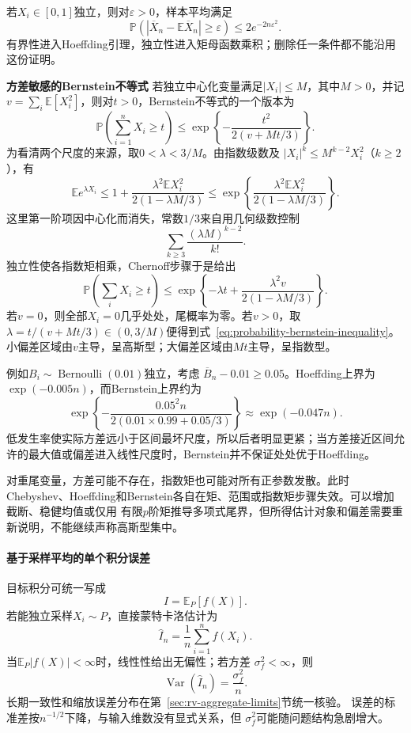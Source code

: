 若\(X_i\in[0,1]\)独立，则对\(\varepsilon>0\)，样本平均满足
\[ \mathbb{P}(|\overline{X}_n-\mathbb{E}\overline{X}_n|
  \geq\varepsilon)\leq 2e^{-2n\varepsilon^2}. \]
有界性进入Hoeffding引理，独立性进入矩母函数乘积；删除任一条件都不能沿用这份证明。

\par\medskip\noindent\textbf{方差敏感的Bernstein不等式}\quad
若独立中心化变量满足\(|X_i|\leq M\)，其中\(M>0\)，并记\(v=\sum_i\mathbb{E}[X_i^2]\)，则对\(t>0\)，Bernstein不等式的一个版本为
\begin{equation}
  \mathbb{P}\left(\sum_{i=1}^{n}X_i\geq t\right)
  \leq
  \exp\left\{
    -\frac{t^2}{2(v+Mt/3)}
  \right\}.
  \label{eq:probability-bernstein-inequality}
\end{equation}
为看清两个尺度的来源，取\(0<\lambda<3/M\)。由指数级数及
\(|X_i|^k\leq M^{k-2}X_i^2\)（\(k\geq2\)），有
\[
  \mathbb{E}e^{\lambda X_i}
  \leq
  1+\frac{\lambda^2\mathbb{E}X_i^2}
           {2(1-\lambda M/3)}
  \leq
  \exp\left\{
    \frac{\lambda^2\mathbb{E}X_i^2}
         {2(1-\lambda M/3)}
  \right\}.
\]
这里第一阶项因中心化而消失，常数\(1/3\)来自用几何级数控制
\[
  \sum_{k\geq3}\frac{(\lambda M)^{k-2}}{k!}.
\]
独立性使各指数矩相乘，Chernoff步骤于是给出
\[
  \mathbb{P}\left(\sum_iX_i\geq t\right)
  \leq
  \exp\left\{
    -\lambda t+\frac{\lambda^2v}
      {2(1-\lambda M/3)}
  \right\}.
\]
若\(v=0\)，则全部\(X_i=0\)几乎处处，尾概率为零。若\(v>0\)，取\(\lambda=t/(v+Mt/3)\in(0,3/M)\)便得到式~\eqref{eq:probability-bernstein-inequality}。小偏差区域由\(v\)主导，呈高斯型；大偏差区域由\(Mt\)主导，呈指数型。

例如\(B_i\sim\operatorname{Bernoulli}(0.01)\)独立，考虑
\(\overline{B}_n-0.01\geq0.05\)。Hoeffding上界为
\(\exp(-0.005n)\)，而Bernstein上界约为
\[
  \exp\left\{
    -\frac{0.05^2n}
      {2(0.01\times0.99+0.05/3)}
  \right\}
  \approx \exp(-0.047n).
\]
低发生率使实际方差远小于区间最坏尺度，所以后者明显更紧；当方差接近区间允许的最大值或偏差进入线性尺度时，Bernstein并不保证处处优于Hoeffding。

对重尾变量，方差可能不存在，指数矩也可能对所有正参数发散。此时Chebyshev、Hoeffding和Bernstein各自在矩、范围或指数矩步骤失效。可以增加截断、稳健均值或仅用
有限\(p\)阶矩推导多项式尾界，但所得估计对象和偏差需要重新说明，不能继续声称高斯型集中。

\paragraph{基于采样平均的单个积分误差}
\label{sec:probability-monte-carlo-variance-reduction}
目标积分可统一写成
\[ I=\mathbb{E}_P[f(X)]. \]
若能独立采样\(X_i\sim P\)，直接蒙特卡洛估计为
\[ \widehat{I}_n
  =\frac{1}{n}\sum_{i=1}^{n}f(X_i). \]
当\(\mathbb E_P|f(X)|<\infty\)时，线性性给出无偏性；若方差
\(\sigma_f^2<\infty\)，则
\[ \operatorname{Var}(\widehat I_n)=\frac{\sigma_f^2}{n}. \]
长期一致性和缩放误差分布在第~\ref{sec:rv-aggregate-limits}节统一核验。
误差的标准差按\(n^{-1/2}\)下降，与输入维数没有显式关系，但
\(\sigma_f^2\)可能随问题结构急剧增大。


